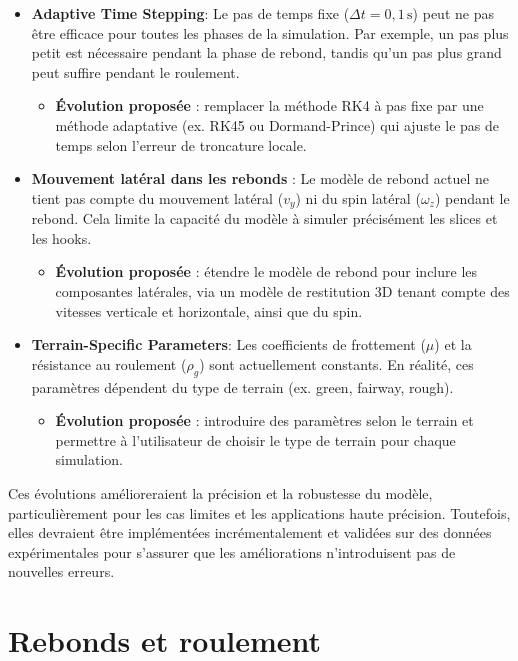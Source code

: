 \documentclass[10pt,a4paper]{report}
\begin{document}
\begin{itemize}
    \item \textbf{Adaptive Time Stepping}:
    Le pas de temps fixe (\( \Delta t = 0{,}1 \, \text{s} \)) peut ne pas être efficace pour toutes les phases de la simulation. Par exemple, un pas plus petit est nécessaire pendant la phase de rebond, tandis qu'un pas plus grand peut suffire pendant le roulement.
    \begin{itemize}
        \item \textbf{Évolution proposée} : remplacer la méthode RK4 à pas fixe par une méthode adaptative (ex. RK45 ou Dormand-Prince) qui ajuste le pas de temps selon l'erreur de troncature locale.
    \end{itemize}

    \item \textbf{Mouvement latéral dans les rebonds} :
    Le modèle de rebond actuel ne tient pas compte du mouvement latéral (\( v_y \)) ni du spin latéral (\( \omega_z \)) pendant le rebond. Cela limite la capacité du modèle à simuler précisément les slices et les hooks.
    \begin{itemize}
        \item \textbf{Évolution proposée} : étendre le modèle de rebond pour inclure les composantes latérales, via un modèle de restitution 3D tenant compte des vitesses verticale et horizontale, ainsi que du spin.
    \end{itemize}

    \item \textbf{Terrain-Specific Parameters}:
    Les coefficients de frottement (\( \mu \)) et la résistance au roulement (\( \rho_g \)) sont actuellement constants. En réalité, ces paramètres dépendent du type de terrain (ex. green, fairway, rough).
    \begin{itemize}
        \item \textbf{Évolution proposée} : introduire des paramètres selon le terrain et permettre à l'utilisateur de choisir le type de terrain pour chaque simulation.
    \end{itemize}
\end{itemize}

Ces évolutions amélioreraient la précision et la robustesse du modèle, particulièrement pour les cas limites et les applications haute précision. Toutefois, elles devraient être implémentées incrémentalement et validées sur des données expérimentales pour s'assurer que les améliorations n'introduisent pas de nouvelles erreurs.


\chapter{Rebonds et roulement}
\end{document}
